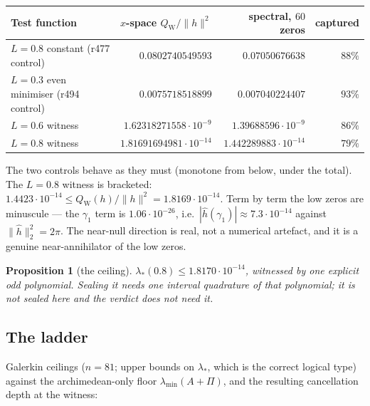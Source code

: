 \documentclass[11pt]{article}
\newtheorem{proposition}{Proposition}
\theoremstyle{remark}
\newcommand{\QW}{Q_{\mathrm W}}
\begin{document}
\begin{center}
\small
\begin{tabular}{@{}lrrr@{}}
\toprule
Test function & $x$-space $\QW/\|h\|^2$
  & spectral, $60$ zeros & captured \\
\midrule
$L=0.8$ constant (r477 control) & $0.0802740549593$
  & $0.07050676638$ & $88\%$ \\
$L=0.3$ even minimiser (r494 control) & $0.0075718518899$
  & $0.007040224407$ & $93\%$ \\
$L=0.6$ witness & $1.62318271558\cdot10^{-9}$
  & $1.39688596\cdot10^{-9}$ & $86\%$ \\
$L=0.8$ witness & $1.81691694981\cdot10^{-14}$
  & $1.442289883\cdot10^{-14}$ & $79\%$ \\
\bottomrule
\end{tabular}
\end{center}

The two controls behave as they must (monotone from below, under the
total).  The $L=0.8$ witness is bracketed:
$1.4423\cdot10^{-14}\le\QW(h)/\|h\|^2=1.8169\cdot10^{-14}$.
Term by term the low zeros are minuscule --- the $\gamma_1$ term is
$1.06\cdot10^{-26}$, i.e.\ $|\widehat h(\gamma_1)|\approx
7.3\cdot10^{-14}$ against $\|\widehat h\|_2^2=2\pi$.
The near-null direction is real, not a numerical artefact, and it is
a genuine near-annihilator of the low zeros.

\begin{proposition}[the ceiling]\label{prop:ceiling}
$\lambda_*(0.8)\le1.8170\cdot10^{-14}$, witnessed by one explicit
odd polynomial.  Sealing it needs one interval quadrature of that
polynomial; it is not sealed here and the verdict does not need it.
\end{proposition}

\subsection{The ladder}

Galerkin ceilings ($n=81$; upper bounds on $\lambda_*$, which is the
correct logical type) against the archimedean-only floor
$\lambda_{\min}(A+\Pi)$, and the resulting cancellation depth at the
witness:
\end{document}
